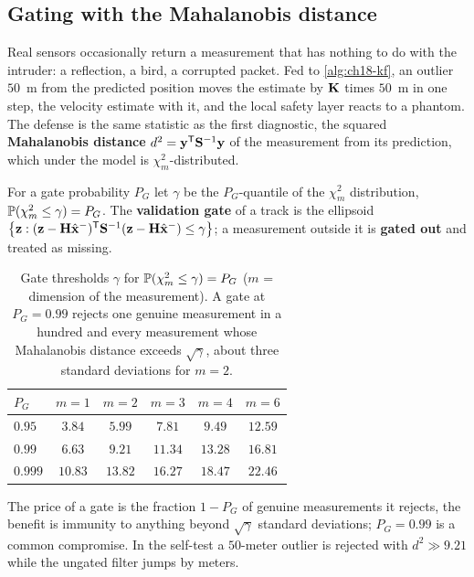 \subsection{Gating with the Mahalanobis distance}
\label{sec:ch18-gating}

Real sensors occasionally return a measurement that has nothing to do with
the intruder: a reflection, a bird, a corrupted packet. Fed to
\cref{alg:ch18-kf}, an outlier $50$~m from the predicted position moves the
estimate by $\mathbf{K}$ times $50$~m in one step, the velocity estimate with it,
and the local safety layer reacts to a phantom. The defense is the same statistic
as the first diagnostic, the squared \textbf{Mahalanobis
distance} $d^2=\mathbf{y}^{\mathsf{T}}\mathbf{S}^{-1}\mathbf{y}$
of the measurement from its prediction, which under the model is
$\chi^2_m$-distributed.

\begin{definition}
\label{def:ch18-gate}
For a gate probability $P_G$ let $\gamma$ be the $P_G$-quantile of the
$\chi^2_m$ distribution, $\mathbb{P}(\chi^2_m\le\gamma)=P_G$. The
\textbf{validation gate} of a track is the ellipsoid
$\left\{ \mathbf{z}:(\mathbf{z}-\mathbf{H}\hat{\mathbf{x}}^-)^{\mathsf{T}}\mathbf{S}^{-1}(\mathbf{z}-\mathbf{H}\hat{\mathbf{x}}^-)\le\gamma \right\}$;
a measurement outside it is \textbf{gated out} and treated as missing.
\end{definition}

\begin{table}[tb]
  \centering\small
  \caption{Gate thresholds $\gamma$ for $\mathbb{P}(\chi^2_m\le\gamma)=P_G$
  ($m$ = dimension of the measurement). A gate at $P_G=0.99$ rejects one
  genuine measurement in a hundred and every measurement whose Mahalanobis
  distance exceeds $\sqrt\gamma$, about three standard deviations for $m=2$.}
  \label{tab:ch18-chi2}
  \begin{tabular}{@{}lccccc@{}}
  \toprule
  $P_G$ & $m=1$ & $m=2$ & $m=3$ & $m=4$ & $m=6$\\
  \midrule
  $0.95$  & $3.84$ & $5.99$ & $7.81$ & $9.49$ & $12.59$\\
  $0.99$  & $6.63$ & $9.21$ & $11.34$ & $13.28$ & $16.81$\\
  $0.999$ & $10.83$ & $13.82$ & $16.27$ & $18.47$ & $22.46$\\
  \bottomrule
  \end{tabular}
\end{table}

The price of a gate is the fraction $1-P_G$ of genuine
measurements it rejects, the benefit is immunity to anything beyond
$\sqrt\gamma$ standard deviations; $P_G=0.99$ is a common compromise. In the
self-test a $50$-meter outlier is rejected with $d^2\gg9.21$ while the
ungated filter jumps by meters.

